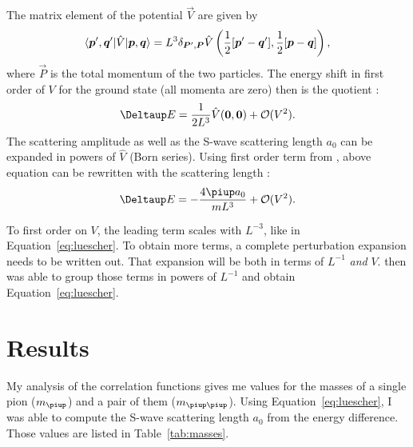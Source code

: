 \documentclass[11pt, english, fleqn, DIV=10, headinclude]{scrartcl}
\newcommand\mpi{m_{\piup}}
\newcommand\mpipi{m_{\piup\piup}}
\begin{document}
The matrix element of the potential $\vec V$ are given by
\parencite[(2.21)]{luescher/volume_dependence}
\[
    \braket{\boldsymbol{p}', \boldsymbol{q}'| \hat V | \boldsymbol{p}, \boldsymbol{q}}
    = L^3 \delta_{\boldsymbol{P}', \boldsymbol{P}} \hat V\left( \frac12 [\boldsymbol{p}' - \boldsymbol{q}'],
    \frac12 [\boldsymbol{p} - \boldsymbol{q}] \right),
\]
where $\vec P$ is the total momentum of the two particles. The energy shift in
first order of $V$ for the ground state (all momenta are zero) then is the
quotient \parencite[(2.24)]{luescher/volume_dependence}:
\[
    \Deltaup E = \frac{1}{2L^3} \hat V(\vec 0, \vec 0) + \mathcal O(V^2).
\]
The scattering amplitude as well as the S-wave scattering length $a_0$ can be
expanded in powers of $\hat V$ (Born series). Using first order term from 
\parencite[(2.18)]{luescher/volume_dependence}, above equation can be rewritten
with the scattering length
\parencite[(2.25)]{luescher/volume_dependence}:
\[
    \Deltaup E = - \frac{4\piup a_0}{m L^3} + \mathcal O(V^2).
\]

To first order on $V$, the leading term scales with $L^{-3}$, like in
Equation~\eqref{eq:luescher}. To obtain more terms, a complete perturbation
expansion needs to be written out. That expansion will be both in terms of
$L^{-1}$ \emph{and} $V$. \citeauthor{luescher/volume_dependence} then was able
to group those terms in powers of $L^{-1}$ and obtain
Equation~\eqref{eq:luescher}.



\section{Results}
\label{sec:results}

My analysis of the correlation functions gives me values for the masses of a
single pion ($\mpi$) and a pair of them ($\mpipi$). Using
Equation~\eqref{eq:luescher}, I was able to compute the S-wave scattering
length $a_0$ from the energy difference. Those values are listed in
Table~\ref{tab:masses}.
\end{document}
